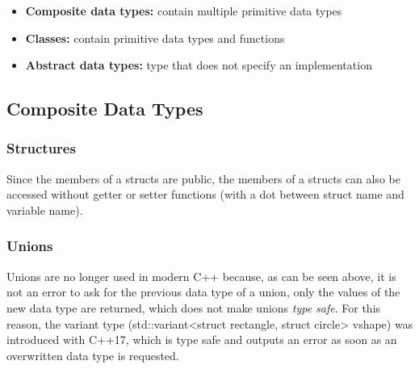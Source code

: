

\begin{itemize}
    \item \textbf{Composite data types:} contain multiple primitive data types
    \item \textbf{Classes:} contain primitive data types and functions
    \item \textbf{Abstract data types:} type that does not specify an implementation
\end{itemize}


\subsection{Composite Data Types}

\subsubsection{Structures}


Since the members of a structs are public, the members of a structs can also be accessed without getter or setter functions (with a dot between struct name and variable name).



\subsubsection{Unions}




Unions are no longer used in modern C++ because, as can be seen above, it is not an error to ask for the previous data type of a union, only the values of the new data type are returned, which does not make unions \emph{type safe}. For this reason, the variant type (std::variant<struct rectangle, struct circle> vshape) was introduced with C++17, which is type safe and outputs an error as soon as an overwritten data type is requested. 

